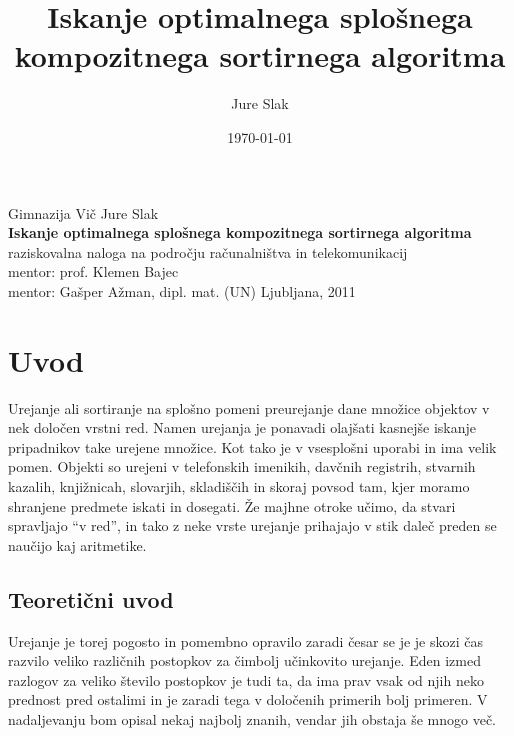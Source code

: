 \documentclass[a4paper,oneside,12pt]{article}
\title{Iskanje optimalnega splošnega kompozitnega sortirnega algoritma}
\author{Jure Slak}
\date{\today}
\begin{document}
\renewcommand{\listfigurename}{Kazalo slik} 
\renewcommand{\listtablename}{Kazalo tabel} 
\renewcommand{\listalgorithmname}{Kazalo algoritmov}

\addto\captionsslovene { %
\renewcommand\bibname{} %
}
\renewcommand\refname{}


\thispagestyle{empty}

\begin{center}{\large
  Gimnazija Vič
  \vfill
  {\Large Jure Slak}\\[20mm]
  {\bf \huge Iskanje optimalnega splošnega kompozitnega sortirnega algoritma}\\[10mm]
  raziskovalna naloga na področju računalništva in telekomunikacij\\[1cm]
  mentor: prof. Klemen Bajec \\[2mm]
  mentor: Gašper Ažman, dipl. mat. (UN)}
  \vfill
  \vfill
  \large Ljubljana, 2011
\end{center}
\pagebreak

\thispagestyle{empty}
\tableofcontents
\pagebreak
\thispagestyle{empty}
\listoffigures
\listoftables
\listofalgorithms
\pagebreak

\section{Uvod}
\label{chapter:uvod}

Urejanje ali sortiranje na splošno pomeni preurejanje dane množice objektov
v nek določen vrstni red.
Namen urejanja je ponavadi olajšati kasnejše iskanje pripadnikov take urejene množice. Kot tako je
v vsesplošni uporabi in ima velik pomen. Objekti so urejeni v telefonskih imenikih,
davčnih registrih, stvarnih kazalih, knjižnicah, slovarjih, skladiščih in skoraj povsod tam,
kjer moramo shranjene predmete iskati in dosegati. Že majhne otroke učimo, da stvari spravljajo
``v red'', in tako z neke vrste urejanje prihajajo v stik daleč preden se naučijo kaj
aritmetike.

\subsection{Teoretični uvod}
\label{chapter:teoreticni}
Urejanje je torej pogosto in pomembno opravilo zaradi česar se je je skozi čas
razvilo veliko različnih postopkov za čimbolj učinkovito urejanje. Eden izmed razlogov za
veliko število postopkov je tudi ta, da ima prav vsak od njih neko prednost pred ostalimi in je
zaradi tega v določenih primerih bolj primeren. V nadaljevanju bom opisal nekaj najbolj znanih, 
vendar jih obstaja še mnogo več. 
\end{document}
